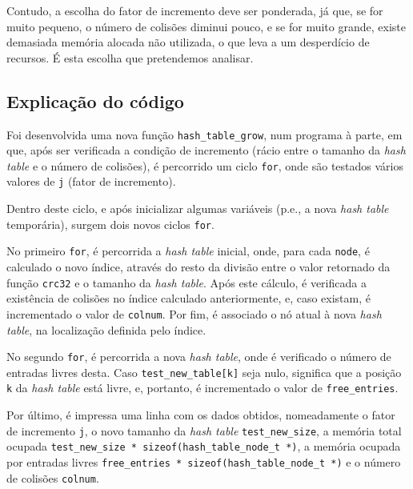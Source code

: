 \documentclass[portuguese,11pt,a4paper,titlepage]{article}
\newcommand{\srcdir}{..}
\newcommand{\hashtablegrowdir}{\srcdir/hash\_table\_grow-test}
\begin{document}
Contudo, a escolha do fator de incremento deve ser ponderada, já que, se for muito pequeno, o número de colisões diminui pouco, e se for muito grande, existe demasiada memória alocada não utilizada, o que leva a um desperdício de recursos. É esta escolha que pretendemos analisar.

\subsection{Explicação do código}
Foi desenvolvida uma nova função \verb|hash_table_grow|, num programa à parte, em que, após ser verificada a condição de incremento (rácio entre o tamanho da \textit{hash table} e o número de colisões), é percorrido um ciclo \verb|for|, onde são testados vários valores de \verb|j| (fator de incremento).



Dentro deste ciclo, e após inicializar algumas variáveis (p.e., a nova \textit{hash table} temporária), surgem dois novos ciclos \verb|for|.

No primeiro \verb|for|, é percorrida a \textit{hash table} inicial, onde, para cada \verb|node|, é calculado o novo índice, através do resto da divisão entre o valor retornado da função \verb|crc32| e o tamanho da \textit{hash table}. Após este cálculo, é verificada a existência de colisões no índice calculado anteriormente, e, caso existam, é incrementado o valor de \verb|colnum|. Por fim, é associado o nó atual à nova \textit{hash table}, na localização definida pelo índice.



No segundo \verb|for|, é percorrida a nova \textit{hash table}, onde é verificado o número de entradas livres desta. Caso \lstinline|test_new_table[k]| seja nulo, significa que a posição \verb|k| da \textit{hash table} está livre, e, portanto, é incrementado o valor de \verb|free_entries|.



Por último, é impressa uma linha com os dados obtidos, nomeadamente o fator de incremento \verb|j|, o novo tamanho da \textit{hash table} \verb|test_new_size|, a memória total ocupada \lstinline|test_new_size * sizeof(hash_table_node_t *)|, a memória ocupada por entradas livres \lstinline|free_entries * sizeof(hash_table_node_t *)| e o número de colisões \verb|colnum|.
\end{document}
